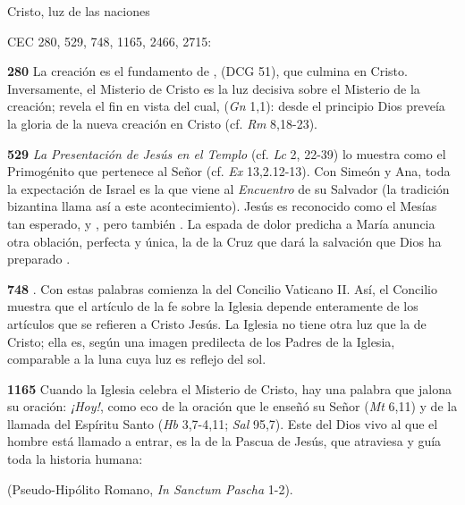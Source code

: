 {Cristo, luz de las naciones

CEC 280, 529, 748, 1165, 2466, 2715:

\textbf{280} La creación es el fundamento de ,  (DCG 51), que culmina en Cristo. Inversamente, el Misterio de Cristo es la luz decisiva sobre el Misterio de la creación; revela el fin en vista del cual,  (\emph{Gn} 1,1): desde el principio Dios preveía la gloria de la nueva creación en Cristo (cf. \emph{Rm} 8,18-23).

\textbf{529} \emph{La Presentación de Jesús en el Templo} (cf. \emph{Lc} 2, 22-39) lo muestra como el Primogénito que pertenece al Señor (cf. \emph{Ex} 13,2.12-13). Con Simeón y Ana, toda la expectación de Israel es la que viene al \emph{Encuentro} de su Salvador (la tradición bizantina llama así a este acontecimiento). Jesús es reconocido como el Mesías tan esperado,  y , pero también . La espada de dolor predicha a María anuncia otra oblación, perfecta y única, la de la Cruz que dará la salvación que Dios ha preparado .

\textbf{748} . Con estas palabras comienza la  del Concilio Vaticano II. Así, el Concilio muestra que el artículo de la fe sobre la Iglesia depende enteramente de los artículos que se refieren a Cristo Jesús. La Iglesia no tiene otra luz que la de Cristo; ella es, según una imagen predilecta de los Padres de la Iglesia, comparable a la luna cuya luz es reflejo del sol.

\textbf{1165} Cuando la Iglesia celebra el Misterio de Cristo, hay una palabra que jalona su oración: \emph{¡Hoy!}, como eco de la oración que le enseñó su Señor (\emph{Mt} 6,11) y de la llamada del Espíritu Santo (\emph{Hb} 3,7-4,11; \emph{Sal} 95,7). Este  del Dios vivo al que el hombre está llamado a entrar, es la  de la Pascua de Jesús, que atraviesa y guía toda la historia humana:

 (Pseudo-Hipólito Romano, \emph{In Sanctum Pascha} 1-2).

}
